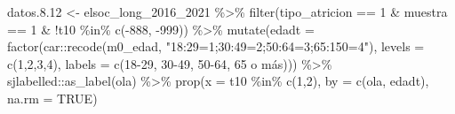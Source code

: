 \documentclass[
  12pt,
]{book}
\newenvironment{Shaded}{\begin{snugshade}}{\end{snugshade}}
\newcommand{\AttributeTok}[1]{\textcolor[rgb]{0.77,0.63,0.00}{#1}}
\newcommand{\ConstantTok}[1]{\textcolor[rgb]{0.00,0.00,0.00}{#1}}
\newcommand{\DecValTok}[1]{\textcolor[rgb]{0.00,0.00,0.81}{#1}}
\newcommand{\FloatTok}[1]{\textcolor[rgb]{0.00,0.00,0.81}{#1}}
\newcommand{\FunctionTok}[1]{\textcolor[rgb]{0.00,0.00,0.00}{#1}}
\newcommand{\NormalTok}[1]{#1}
\newcommand{\OtherTok}[1]{\textcolor[rgb]{0.56,0.35,0.01}{#1}}
\newcommand{\SpecialCharTok}[1]{\textcolor[rgb]{0.00,0.00,0.00}{#1}}
\newcommand{\StringTok}[1]{\textcolor[rgb]{0.31,0.60,0.02}{#1}}
\begin{document}
\begin{Shaded}
\begin{Highlighting}[]
\NormalTok{datos.}\FloatTok{8.12} \OtherTok{\textless{}{-}}\NormalTok{ elsoc\_long\_2016\_2021 }\SpecialCharTok{\%\textgreater{}\%} 
  \FunctionTok{filter}\NormalTok{(tipo\_atricion }\SpecialCharTok{==} \DecValTok{1} \SpecialCharTok{\&}\NormalTok{ muestra }\SpecialCharTok{==} \DecValTok{1} \SpecialCharTok{\&} \SpecialCharTok{!}\NormalTok{t10 }\SpecialCharTok{\%in\%} \FunctionTok{c}\NormalTok{(}\SpecialCharTok{{-}}\DecValTok{888}\NormalTok{, }\SpecialCharTok{{-}}\DecValTok{999}\NormalTok{)) }\SpecialCharTok{\%\textgreater{}\%} 
  \FunctionTok{mutate}\NormalTok{(}\AttributeTok{edadt =} \FunctionTok{factor}\NormalTok{(car}\SpecialCharTok{::}\FunctionTok{recode}\NormalTok{(m0\_edad, }
                                    \StringTok{"18:29=1;30:49=2;50:64=3;65:150=4"}\NormalTok{),}
                        \AttributeTok{levels =} \FunctionTok{c}\NormalTok{(}\DecValTok{1}\NormalTok{,}\DecValTok{2}\NormalTok{,}\DecValTok{3}\NormalTok{,}\DecValTok{4}\NormalTok{), }
                        \AttributeTok{labels =} \FunctionTok{c}\NormalTok{(}\StringTok{\textquotesingle{}18{-}29\textquotesingle{}}\NormalTok{, }\StringTok{\textquotesingle{}30{-}49\textquotesingle{}}\NormalTok{, }\StringTok{\textquotesingle{}50{-}64\textquotesingle{}}\NormalTok{, }\StringTok{\textquotesingle{}65 o más\textquotesingle{}}\NormalTok{))) }\SpecialCharTok{\%\textgreater{}\%}
\NormalTok{  sjlabelled}\SpecialCharTok{::}\FunctionTok{as\_label}\NormalTok{(ola) }\SpecialCharTok{\%\textgreater{}\%}
  \FunctionTok{prop}\NormalTok{(}\AttributeTok{x =}\NormalTok{ t10 }\SpecialCharTok{\%in\%} \FunctionTok{c}\NormalTok{(}\DecValTok{1}\NormalTok{,}\DecValTok{2}\NormalTok{), }\AttributeTok{by =} \FunctionTok{c}\NormalTok{(ola, edadt), }\AttributeTok{na.rm =} \ConstantTok{TRUE}\NormalTok{)}


\end{Highlighting}
\end{Shaded}
\end{document}
